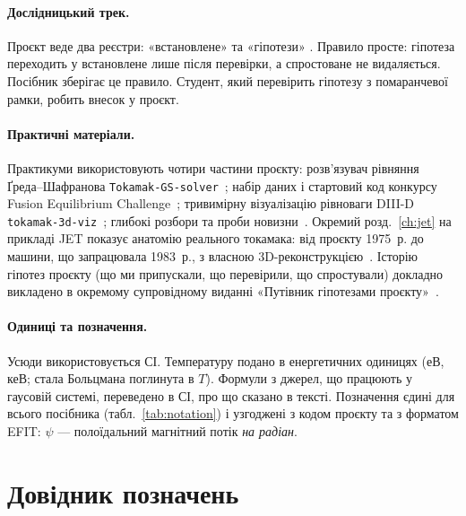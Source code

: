 \paragraph{Дослідницький трек.} Проєкт веде два реєстри: «встановлене» та «гіпотези»
\cite{ProjRegisters}. Правило просте: гіпотеза переходить у встановлене лише після
перевірки, а спростоване не видаляється. Посібник зберігає це правило. Студент, який
перевірить гіпотезу з помаранчевої рамки, робить внесок у проєкт.

\paragraph{Практичні матеріали.} Практикуми використовують чотири частини проєкту:
розв'язувач рівняння Ґреда--Шафранова \texttt{Tokamak-GS-solver}~\cite{ProjGSsolver};
набір даних і стартовий код конкурсу Fusion Equilibrium Challenge~\cite{FEC2026};
тривимірну візуалізацію рівноваги DIII-D \texttt{tokamak-3d-viz}~\cite{ProjViz};
глибокі розбори та проби новизни~\cite{ProjDeepDives}.
Окремий розд.~\ref{ch:jet} на прикладі JET показує анатомію реального токамака: від проєкту
1975~р. до машини, що запрацювала 1983~р., з власною 3D-реконструкцією~\cite{ProjJET}.
Історію гіпотез проєкту (що ми припускали, що перевірили, що спростували) докладно
викладено в окремому супровідному виданні «Путівник гіпотезами проєкту»~\cite{ProjGuide}.

\paragraph{Одиниці та позначення.} Усюди використовується СІ. Температуру подано в
енергетичних одиницях (еВ, кеВ; стала Больцмана поглинута в $T$). Формули з джерел,
що працюють у гаусовій системі, переведено в СІ, про що сказано в тексті. Позначення
єдині для всього посібника (табл.~\ref{tab:notation}) і узгоджені з кодом проєкту та
з форматом EFIT: $\psi$ --- полоїдальний магнітний потік \emph{на радіан}.

\clearpage
\section*{Довідник позначень}\label{sec:notation}

